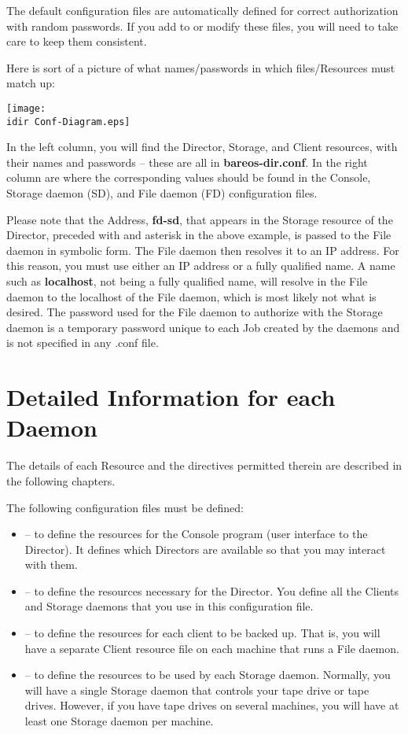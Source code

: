 The default configuration files are automatically defined for correct
authorization with random passwords. If you add to or modify these files, you
will need to take care to keep them consistent.

Here is sort of a picture of what names/passwords in which files/Resources
must match up:

\texttt{[image: \\idir Conf-Diagram.eps]}

In the left column, you will find the Director, Storage, and Client resources,
with their names and passwords -- these are all in {\bf bareos-dir.conf}. In
the right column are where the corresponding values should be found in the
Console, Storage daemon (SD), and File daemon (FD) configuration files.

Please note that the Address, {\bf fd-sd}, that appears in the Storage
resource of the Director, preceded with and asterisk in the above example, is
passed to the File daemon in symbolic form. The File daemon then resolves it
to an IP address. For this reason, you must use either an IP address or a
fully qualified name. A name such as {\bf localhost}, not being a fully
qualified name, will resolve in the File daemon to the localhost of the File
daemon, which is most likely not what is desired. The password used for the
File daemon to authorize with the Storage daemon is a temporary password
unique to each Job created by the daemons and is not specified in any .conf
file.

\section{Detailed Information for each Daemon}

The details of each Resource and the directives permitted therein are
described in the following chapters.

The following configuration files must be defined:

\begin{itemize}
\item
    -- to define the resources for
   the Console program (user interface to the Director).  It defines which
Directors are  available so that you may interact with them.
\item
    -- to define the resources
   necessary for the Director. You define all the Clients  and Storage daemons
that you use in this configuration file.
\item
    -- to define the resources for
   each client to be backed up. That is, you will have a separate  Client
resource file on each machine that runs a File daemon.
\item
    -- to define the resources to
   be used by each Storage daemon. Normally, you will have  a single Storage
daemon that controls your tape drive or tape  drives. However, if you have
tape drives on several machines,  you will have at least one Storage daemon
per machine.
\end{itemize}

